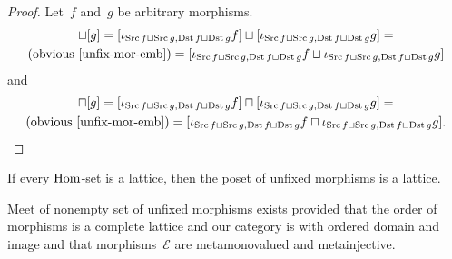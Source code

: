 \begin{proof}
Let~$f$ and~$g$ be arbitrary morphisms.
\begin{multline*}
[f]\sqcup[g] =
[\iota_{\Src f\sqcup\Src g,\Dst f\sqcup\Dst g}f]\sqcup
[\iota_{\Src f\sqcup\Src g,\Dst f\sqcup\Dst g}g] = \\
\text{(obvious~\ref{unfix-mor-emb})} =
[\iota_{\Src f\sqcup\Src g,\Dst f\sqcup\Dst g}f\sqcup
\iota_{\Src f\sqcup\Src g,\Dst f\sqcup\Dst g}g]
\end{multline*}
and
\begin{multline*}
[f]\sqcap[g] =
[\iota_{\Src f\sqcup\Src g,\Dst f\sqcup\Dst g}f]\sqcap
[\iota_{\Src f\sqcup\Src g,\Dst f\sqcup\Dst g}g] = \\
\text{(obvious~\ref{unfix-mor-emb})} =
[\iota_{\Src f\sqcup\Src g,\Dst f\sqcup\Dst g}f\sqcap
\iota_{\Src f\sqcup\Src g,\Dst f\sqcup\Dst g}g].
\end{multline*}
\end{proof}

\begin{cor}
If every $\operatorname{Hom}$-set is a lattice, then
the poset of unfixed morphisms is a lattice.
\end{cor}

\begin{thm}
Meet of nonempty set of unfixed morphisms
exists provided that the order of morphisms is
a complete lattice and our category is with ordered domain
and image and that morphisms~$\mathcal{E}$ are metamonovalued
and metainjective.
\end{thm}

